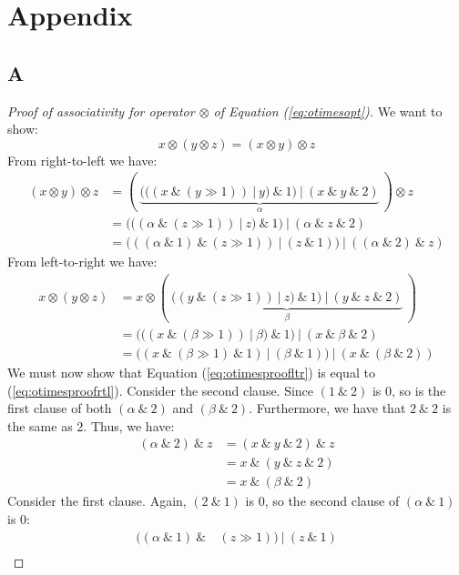 \section*{Appendix}

\subsection*{A}
\label{app:A}

\begin{proof}[Proof of associativity for operator $\otimes$ of Equation (\ref{eq:otimesopt})]
  We want to show:
\begin{equation}
  \label{eq:aconc}
  x \otimes (y \otimes z) = (x \otimes y) \otimes z
\end{equation}
From right-to-left we have:
\begin{align}
  (x \otimes y) \otimes z &= (~\underbrace{(((x~\&~(y \gg 1))~|~y)~\&~1)~|~(x~\&~y~\&~2)}_{\alpha}~) \otimes z\\
              &= (((\alpha~\&~(z \gg 1))~|~z)~\&~1)~|~(\alpha~\&~z~\&~2)\\
              \label{eq:otimesproofltr}
              &= (((\alpha~\&~1)~\&~(z \gg 1))~|~(z~\&~1))~|~((\alpha~\&~2)~\&~z)
\end{align}
From left-to-right we have:
\begin{align}
  x \otimes (y \otimes z) &= x \otimes (~\underbrace{((y~\&~(z \gg 1))~|~z)~\&~1)~|~(y~\&~z~\&~2)}_{\beta}~)\\
  &= (((x~\&~(\beta \gg 1))~|~\beta)~\&~1)~|~(x~\&~\beta~\&~2)\\
  \label{eq:otimesproofrtl}
  &= ((x~\&~(\beta \gg 1)~\&~1)~|~(\beta~\&~1))~|~(x~\&~(\beta~\&~2))
\end{align}
We must now show that Equation (\ref{eq:otimesproofltr}) is equal to
(\ref{eq:otimesproofrtl}). Consider the second clause. Since $(1~\&~2)$ is $0$,
so is the first clause of both $(\alpha~\&~2)$ and $(\beta~\&~2)$. Furthermore, we have
that $2~\&~2$ is the same as $2$. Thus, we have:
\begin{align}
  (\alpha~\&~2)~\&~z &= (x~\&~y~\&~2)~\&~z\\
                &= x~\&~(y~\&~z~\&~2)\\
                &= x~\&~(\beta~\&~2)
\end{align}
Consider the first clause. Again, $(2~\&~1)$ is $0$, so the second clause of $(\alpha~\&~1)$ is $0$:
\begin{align}
  ((\alpha~\&~1)~\&~&(z \gg 1))~|~(z~\&~1) \\

\end{align}
\end{proof}
